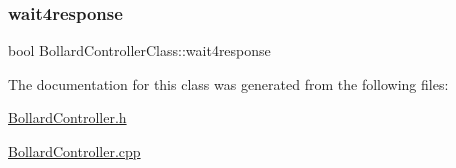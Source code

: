 \mbox{\label{class_bollard_controller_class_a8381678e8f8a4cbf15c72fb6e03d534d}} 
\subsubsection{\texorpdfstring{wait4response}{wait4response}}
{\footnotesize\ttfamily bool Bollard\+Controller\+Class\+::wait4response\hspace{0.3cm}{\ttfamily [private]}}



The documentation for this class was generated from the following files\+:\begin{DoxyCompactItemize}
\item 
\mbox{\hyperlink{_bollard_controller_8h}{Bollard\+Controller.\+h}}\item 
\mbox{\hyperlink{_bollard_controller_8cpp}{Bollard\+Controller.\+cpp}}\end{DoxyCompactItemize}
